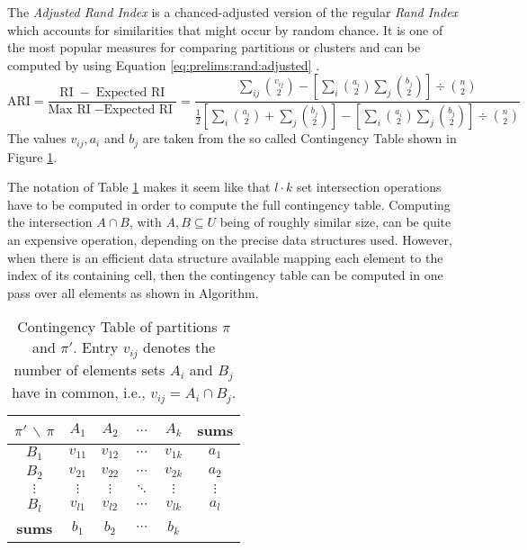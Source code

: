 		The \textit{Adjusted Rand Index} is a chanced-adjusted version of the regular \textit{Rand Index} which accounts for similarities that might occur by random chance.
		It is one of the most popular measures for comparing partitions or clusters and can be computed by using Equation \ref{eq:prelims:rand:adjusted} \cite{sundqvistAdjustingAdjustedRand2020}.
		\begin{equation}
			\label{eq:prelims:rand:adjusted}
			\mathrm{ARI} = \frac{\mathrm{RI}\; - \;\text{Expected RI}}{\text{Max RI}\; - \text{Expected RI} \;} = \frac{\sum\nolimits_{ij} \binom{v_{ij}}{2} - \left[ \sum\nolimits_i \binom{a_i}{2} \sum\nolimits_j \binom{b_j}{2} \right] \div \binom{n}{2}}{\frac{1}{2} \left[ \sum\nolimits_i \binom{a_i}{2} +  \sum\nolimits_j \binom{b_j}{2} \right] - \left[ \sum\nolimits_i \binom{a_i}{2} \sum\nolimits_j \binom{b_j}{2} \right] \div \binom{n}{2}}
		\end{equation}
		The values $v_{ij}, a_i$ and $b_j$ are taken from the so called Contingency Table shown in Figure \ref{fig:prelims:rand:contingency}.
		
		The notation of Table \ref{fig:prelims:rand:contingency} makes it seem like that $l \cdot k$ set intersection operations have to be computed in order to compute the full contingency table.
		Computing the intersection $A \cap B$, with $A, B \subseteq U$ being of roughly similar size, can be quite an expensive operation, depending on the precise data structures used.
		However, when there is an efficient data structure available mapping each element to the index of its containing cell, then the contingency table can be computed in one pass over all elements as shown in Algorithm.
		
		\begin{table}[h!]
			\centering
			\begin{tabular}{c|cccc|c}
				$\pi'$ $\backslash$ $\pi$ & $A_1$ & $A_2$ & $\ldots$ & $A_k$ & \textbf{sums} \\
				\toprule
				$B_1$ & $v_{11}$ & $v_{12}$ & $\cdots$ & $v_{1k}$ & $a_1$ \\
				$B_2$ & $v_{21}$ & $v_{22}$ & $\cdots$ & $v_{2k}$ & $a_2$ \\
				$\vdots$ & $\vdots$ & $\vdots$ & $\ddots$ & $\vdots$ & $\vdots$\\
				$B_l$ & $v_{l1}$ & $v_{l2}$ & $\cdots$ & $v_{lk}$ & $a_l$ \\
				\midrule
				\textbf{sums} & $b_1$ & $b_2$ & $\cdots$ & $b_k$ &
			\end{tabular}
			\caption{Contingency Table of partitions $\pi$ and $\pi'$. Entry $v_{ij}$ denotes the number of elements sets $A_i$ and $B_j$ have in common, i.e., $v_{ij} = A_i \cap B_j$.}
			\label{fig:prelims:rand:contingency}
		\end{table}
		
